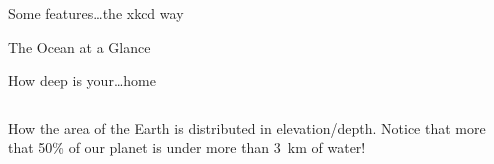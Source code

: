 \begin{myFrame}{Some features\ldots the xkcd way}{}
	\bigskip
\end{myFrame}

\begin{myFrame}{The Ocean at a Glance}{}
	\bigskip
	
\end{myFrame}

\begin{myFrame}{How deep is your\ldots home}{}
\bigskip

\begin{columns}


{How the area of the Earth is distributed in elevation/depth. \newline Notice that more that 50\% of our planet is under more than 3~km of water! }{\garrison}
\end{columns}

\end{myFrame}


